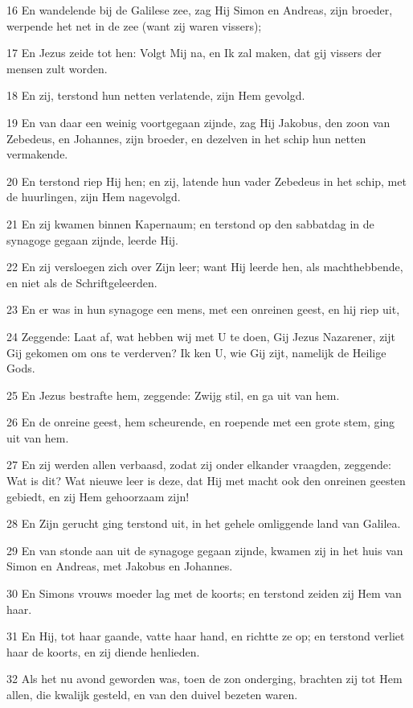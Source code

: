 \par 16 En wandelende bij de Galilese zee, zag Hij Simon en Andreas, zijn broeder, werpende het net in de zee (want zij waren vissers);
\par 17 En Jezus zeide tot hen: Volgt Mij na, en Ik zal maken, dat gij vissers der mensen zult worden.
\par 18 En zij, terstond hun netten verlatende, zijn Hem gevolgd.
\par 19 En van daar een weinig voortgegaan zijnde, zag Hij Jakobus, den zoon van Zebedeus, en Johannes, zijn broeder, en dezelven in het schip hun netten vermakende.
\par 20 En terstond riep Hij hen; en zij, latende hun vader Zebedeus in het schip, met de huurlingen, zijn Hem nagevolgd.
\par 21 En zij kwamen binnen Kapernaum; en terstond op den sabbatdag in de synagoge gegaan zijnde, leerde Hij.
\par 22 En zij versloegen zich over Zijn leer; want Hij leerde hen, als machthebbende, en niet als de Schriftgeleerden.
\par 23 En er was in hun synagoge een mens, met een onreinen geest, en hij riep uit,
\par 24 Zeggende: Laat af, wat hebben wij met U te doen, Gij Jezus Nazarener, zijt Gij gekomen om ons te verderven? Ik ken U, wie Gij zijt, namelijk de Heilige Gods.
\par 25 En Jezus bestrafte hem, zeggende: Zwijg stil, en ga uit van hem.
\par 26 En de onreine geest, hem scheurende, en roepende met een grote stem, ging uit van hem.
\par 27 En zij werden allen verbaasd, zodat zij onder elkander vraagden, zeggende: Wat is dit? Wat nieuwe leer is deze, dat Hij met macht ook den onreinen geesten gebiedt, en zij Hem gehoorzaam zijn!
\par 28 En Zijn gerucht ging terstond uit, in het gehele omliggende land van Galilea.
\par 29 En van stonde aan uit de synagoge gegaan zijnde, kwamen zij in het huis van Simon en Andreas, met Jakobus en Johannes.
\par 30 En Simons vrouws moeder lag met de koorts; en terstond zeiden zij Hem van haar.
\par 31 En Hij, tot haar gaande, vatte haar hand, en richtte ze op; en terstond verliet haar de koorts, en zij diende henlieden.
\par 32 Als het nu avond geworden was, toen de zon onderging, brachten zij tot Hem allen, die kwalijk gesteld, en van den duivel bezeten waren.

